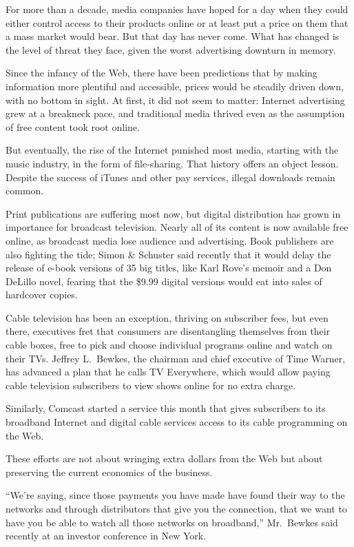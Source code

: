 ﻿\documentclass[12pt]{article}
\begin{document}
For more than a decade, media companies have hoped for a day when they could either control access
to their products online or at least put a price on them that a mass market would bear. But that day
has never come. What has changed is the level of threat they face, given the worst advertising
downturn in memory.

Since the infancy of the Web, there have been predictions that by making information more plentiful
and accessible, prices would be steadily driven down, with no bottom in sight. At first, it did not
seem to matter: Internet advertising grew at a breakneck pace, and traditional media thrived even as
the assumption of free content took root online.

But eventually, the rise of the Internet punished most media, starting with the music industry, in
the form of file-sharing. That history offers an object lesson. Despite the success of iTunes and
other pay services, illegal downloads remain common.

Print publications are suffering most now, but digital distribution has grown in importance for
broadcast television. Nearly all of its content is now available free online, as broadcast media
lose audience and advertising. Book publishers are also fighting the tide; Simon \& Schuster said
recently that it would delay the release of e-book versions of 35 big titles, like Karl Rove's
memoir and a Don DeLillo novel, fearing that the \$9.99 digital versions would eat into sales of
hardcover copies.

Cable television has been an exception, thriving on subscriber fees, but even there, executives fret
that consumers are disentangling themselves from their cable boxes, free to pick and choose
individual programs online and watch on their TVs. Jeffrey L.~Bewkes, the chairman and chief
executive of Time Warner, has advanced a plan that he calls TV Everywhere, which would allow paying
cable television subscribers to view shows online for no extra charge.

Similarly, Comcast started a service this month that gives subscribers to its broadband Internet and
digital cable services access to its cable programming on the Web.

These efforts are not about wringing extra dollars from the Web but about preserving the current
economics of the business.

``We're saying, since those payments you have made have found their way to the networks and through
distributors that give you the connection, that we want to have you be able to watch all those
networks on broadband,'' Mr.~Bewkes said recently at an investor conference in New York.
\end{document}
